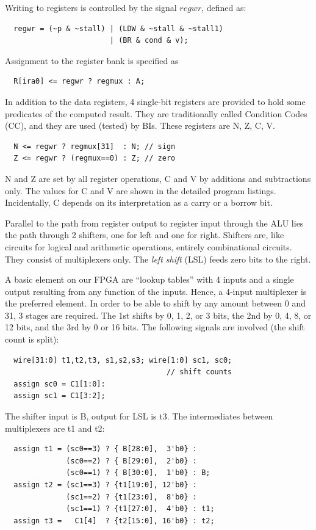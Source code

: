 Writing to registers is controlled by the signal $regwr$, defined as:
\begin{verbatim}
  regwr = (~p & ~stall) | (LDW & ~stall & ~stall1)
                        | (BR & cond & v);
\end{verbatim}

Assignment to the register bank is specified as
\begin{verbatim}
  R[ira0] <= regwr ? regmux : A;
\end{verbatim}

In addition to the data registers, 4 single-bit registers are provided to hold some predicates of
the computed result. They are traditionally called Condition Codes (CC), and they are used (tested)
by BIs. These registers are N, Z, C, V.
\begin{verbatim}
  N <= regwr ? regmux[31]  : N; // sign
  Z <= regwr ? (regmux==0) : Z; // zero
\end{verbatim}

N and Z are set by all register operations, C and V by additions and subtractions only. The values
for C and V are shown in the detailed program listings. Incidentally, C depends on its interpretation
as a carry or a borrow bit.

Parallel to the path from register output to register input through the ALU lies the path through
2 shifters, one for left and one for right. Shifters are, like circuits for logical and arithmetic
operations, entirely combinational circuits. They consist of multiplexers only. The \emph{left shift}
(LSL) feeds zero bits to the right.

A basic element on our FPGA are “lookup tables” with 4 inputs and a single output resulting from
any function of the inputs. Hence, a 4-input multiplexer is the preferred element. In order to be
able to shift by any amount between 0 and 31, 3 stages are required. The 1st shifts by 0, 1, 2, or
3 bits, the 2nd by 0, 4, 8, or 12 bits, and the 3rd by 0 or 16 bits. The following signals are
involved (the shift count is split):
\begin{verbatim}
  wire[31:0] t1,t2,t3, s1,s2,s3; wire[1:0] sc1, sc0;
                                     // shift counts
  assign sc0 = C1[1:0]:
  assign sc1 = C1[3:2];
\end{verbatim}

The shifter input is B, output for LSL is t3. The intermediates between multiplexers are t1 and t2: 
\begin{verbatim}
  assign t1 = (sc0==3) ? { B[28:0],  3'b0} :
              (sc0==2) ? { B[29:0],  2'b0} :
              (sc0==1) ? { B[30:0],  1'b0} : B;
  assign t2 = (sc1==3) ? {t1[19:0], 12'b0} :
              (sc1==2) ? {t1[23:0],  8'b0} :
              (sc1==1) ? {t1[27:0],  4'b0} : t1;
  assign t3 =   C1[4]  ? {t2[15:0], 16'b0} : t2;
\end{verbatim}

